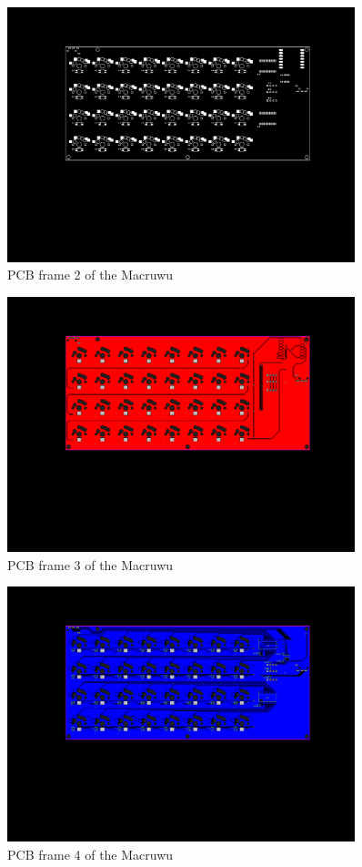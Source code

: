 \documentclass[english, 12pt]{scrartcl}
\begin{document}
	\begin{figure}[H]
		\centering
		\includegraphics[width=0.9\textwidth]{Macruwu PCB_2}
		\caption{PCB frame 2 of the Macruwu}
	\end{figure}
	\begin{figure}[H]
		\centering
		\includegraphics[width=0.9\textwidth]{Macruwu PCB_3}
		\caption{PCB frame 3 of the Macruwu}
	\end{figure}
	\begin{figure}[H]
		\centering
		\includegraphics[width=0.9\textwidth]{Macruwu PCB_4}
		\caption{PCB frame 4 of the Macruwu}
	\end{figure}
\end{document}
